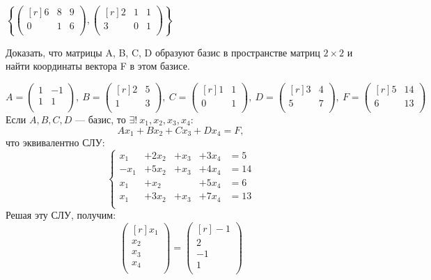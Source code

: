 $\left\{
\begin{pmatrix*}[r]
6 & 8 & 9 \\
0 & 1 & 6 \\
\end{pmatrix*} 
,
\begin{pmatrix*}[r]
2 & 1 & 1 \\
3 & 0 & 1 \\
\end{pmatrix*} 
\right\}$\\
\begin{prim}
	Доказать, что матрицы A, B, C, D образуют базис в пространстве матриц $2 \times 2$ и найти координаты вектора F в этом базисе.
\end{prim}
$$
A=
\begin{pmatrix*}
1 & -1 \\
1 & 1  \\
\end{pmatrix*} 
,\  %
B=
\begin{pmatrix*}[r]
2 & 5 \\
1 & 3  \\
\end{pmatrix*}
,\  
C=
\begin{pmatrix*}[r]
1 & 1 \\
0 & 1  \\
\end{pmatrix*} 
, \ 
D=
\begin{pmatrix*}[r]
3 & 4 \\
5 & 7  \\
\end{pmatrix*} 
,\  
F=
\begin{pmatrix*}[r]
5 & 14 \\
6 & 13  \\
\end{pmatrix*} 
$$
Если $A, B, C, D$ --- базис, то $\exists !\ x_1, x_2, x_3, x_4$:
$$
Ax_1+Bx_2+Cx_3+Dx_4=F,
$$
что эквивалентно СЛУ:
$$
\left\{
\begin{array}{rrrrl}
x_1&+2x_2&+x_3&+3x_4&=5\\
-x_1&+5x_2&+x_3&+4x_4&=14\\
x_1&+x_2&&+5x_4&=6\\
x_1&+3x_2&+x_3&+7x_4&=13\\
\end{array}
\right.
$$
Решая эту СЛУ, получим:
$$
\begin{pmatrix*}[r]
x_1\\
x_2\\
x_3\\
x_4\\
\end{pmatrix*}
=
\begin{pmatrix*}[r]
-1\\
2\\
-1\\
1\\
\end{pmatrix*}
$$
